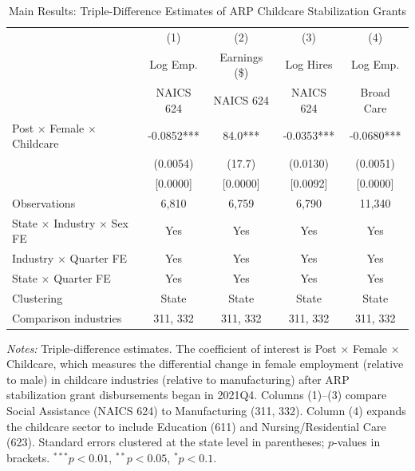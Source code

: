 \begin{table}[htbp]
\centering
\caption{Main Results: Triple-Difference Estimates of ARP Childcare Stabilization Grants}
\label{tab:main}
\begin{tabular}{lcccc}
\toprule
 & (1) & (2) & (3) & (4) \\
 & Log Emp. & Earnings (\$) & Log Hires & Log Emp. \\
 & NAICS 624 & NAICS 624 & NAICS 624 & Broad Care \\
\midrule
Post $\times$ Female $\times$ Childcare & -0.0852*** & 84.0*** & -0.0353*** & -0.0680*** \\
 & (0.0054) & (17.7) & (0.0130) & (0.0051) \\
 & [0.0000] & [0.0000] & [0.0092] & [0.0000] \\
\midrule
Observations & 6,810 & 6,759 & 6,790 & 11,340 \\
State $\times$ Industry $\times$ Sex FE & Yes & Yes & Yes & Yes \\
Industry $\times$ Quarter FE & Yes & Yes & Yes & Yes \\
State $\times$ Quarter FE & Yes & Yes & Yes & Yes \\
Clustering & State & State & State & State \\
Comparison industries & 311, 332 & 311, 332 & 311, 332 & 311, 332 \\
\bottomrule
\end{tabular}
\begin{tablenotes}[flushleft]
\small
\item \textit{Notes:} Triple-difference estimates. The coefficient of interest is Post $\times$ Female $\times$ Childcare, which measures the differential change in female employment (relative to male) in childcare industries (relative to manufacturing) after ARP stabilization grant disbursements began in 2021Q4. Columns (1)--(3) compare Social Assistance (NAICS 624) to Manufacturing (311, 332). Column (4) expands the childcare sector to include Education (611) and Nursing/Residential Care (623). Standard errors clustered at the state level in parentheses; $p$-values in brackets. $^{***}p<0.01$, $^{**}p<0.05$, $^{*}p<0.1$.
\end{tablenotes}
\end{table}
